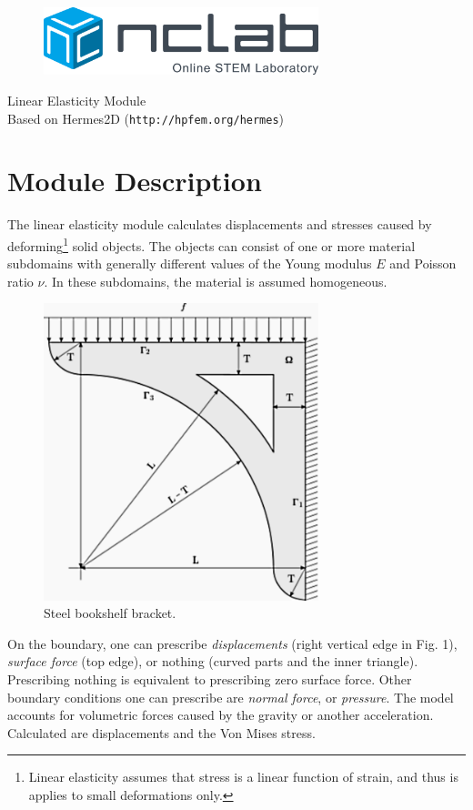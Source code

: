 \documentclass{article}
\begin{document}
\large

\vbox{}
\vspace{-2cm}
\begin{figure}[!ht]
\includegraphics[width=8cm]{img/logo.png}
\vspace{4mm}
\end{figure}
\noindent
\begin{center}
{\Huge Linear Elasticity Module}\\[2mm]
Based on Hermes2D ({\tt http://hpfem.org/hermes})\\[6mm]
\end{center}
\section{Module Description}

The linear elasticity module calculates displacements and stresses 
caused by deforming\footnote{Linear elasticity assumes that stress is a linear function of strain, and thus is applies to small deformations only.} solid objects. 
The objects can consist of one or more material subdomains with generally different values of the Young modulus $E$ and 
Poisson ratio $\nu$. In these subdomains, the material is assumed homogeneous.

\begin{figure}[!ht]
\begin{center}
\includegraphics[width=8cm]{img/elastsample1.png}
\caption{Steel bookshelf bracket.}
\vspace{4mm}
\end{center}
\end{figure}
\noindent
On the boundary, one can prescribe {\em displacements} (right vertical edge 
in Fig. 1), {\em surface force} (top edge), or nothing (curved parts and the 
inner triangle). Prescribing nothing is equivalent to prescribing zero surface force.
Other boundary conditions one can prescribe are {\em normal force}, or {\em pressure}.
The model accounts for volumetric forces caused by the gravity or another acceleration. 
Calculated are displacements and the Von Mises stress.
\end{document}

